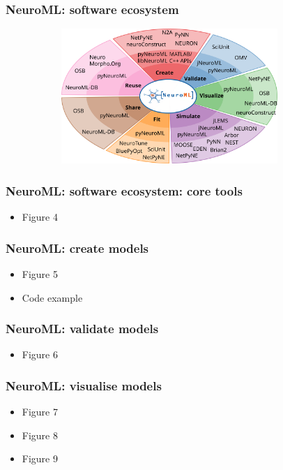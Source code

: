 \begin{frame}[c]
  \frametitle{NeuroML: software ecosystem}
\begin{figure}[t]
  \begin{figure}[h]
    \centering
    \includegraphics[width=0.9\textwidth]{99_images/ecosystem-onion}
  \end{figure}%
\end{figure}
\end{frame}
\begin{frame}[c]
  \frametitle{NeuroML: software ecosystem: core tools}
  \begin{itemize}
    \item Figure 4
  \end{itemize}
\end{frame}
\begin{frame}[c]
  \frametitle{NeuroML: create models}
  \begin{itemize}
    \item Figure 5
    \item Code example
  \end{itemize}
\end{frame}
\begin{frame}[c]
  \frametitle{NeuroML: validate models}
  \begin{itemize}
    \item Figure 6
  \end{itemize}
\end{frame}
\begin{frame}[c]
  \frametitle{NeuroML: visualise models}
  \begin{itemize}
    \item Figure 7
    \item Figure 8
    \item Figure 9
  \end{itemize}
\end{frame}
